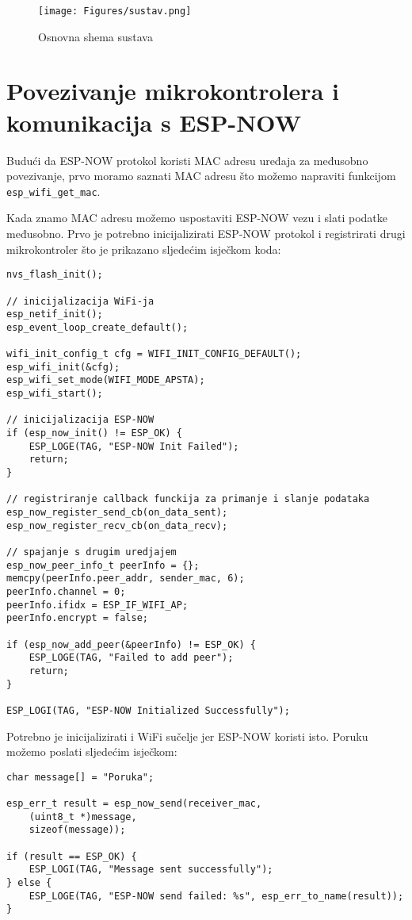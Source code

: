 \documentclass[seminarskirad]{fer}
\begin{document}
\begin{figure}[h!]
  \centering
  \texttt{[image: Figures/sustav.png]} 
  \caption{Osnovna shema sustava}
  \label{slk:prvaslika}
\end{figure}

\section{Povezivanje mikrokontrolera i komunikacija s ESP-NOW}

Budući da ESP-NOW protokol koristi MAC adresu uređaja za međusobno povezivanje, prvo moramo saznati MAC adresu što možemo napraviti funkcijom \verb|esp_wifi_get_mac|.

Kada znamo MAC adresu možemo uspostaviti ESP-NOW vezu i slati podatke međusobno. Prvo je potrebno inicijalizirati ESP-NOW protokol i registrirati drugi mikrokontroler što je prikazano sljedećim isječkom koda:

\begin{lstlisting}[caption=Inicijalizacija protokola]
nvs_flash_init();

// inicijalizacija WiFi-ja
esp_netif_init();
esp_event_loop_create_default();

wifi_init_config_t cfg = WIFI_INIT_CONFIG_DEFAULT();
esp_wifi_init(&cfg);
esp_wifi_set_mode(WIFI_MODE_APSTA);
esp_wifi_start();

// inicijalizacija ESP-NOW
if (esp_now_init() != ESP_OK) {
    ESP_LOGE(TAG, "ESP-NOW Init Failed");
    return;
}

// registriranje callback funckija za primanje i slanje podataka
esp_now_register_send_cb(on_data_sent);
esp_now_register_recv_cb(on_data_recv);

// spajanje s drugim uredjajem
esp_now_peer_info_t peerInfo = {};
memcpy(peerInfo.peer_addr, sender_mac, 6);
peerInfo.channel = 0;
peerInfo.ifidx = ESP_IF_WIFI_AP; 
peerInfo.encrypt = false;

if (esp_now_add_peer(&peerInfo) != ESP_OK) {
    ESP_LOGE(TAG, "Failed to add peer");
    return;
}

ESP_LOGI(TAG, "ESP-NOW Initialized Successfully");
\end{lstlisting}

Potrebno je inicijalizirati i WiFi sučelje jer ESP-NOW koristi isto. Poruku možemo poslati sljedećim isječkom:

\begin{lstlisting}[caption=Komunikacija ESP-NOW protokolom]
char message[] = "Poruka";
    
esp_err_t result = esp_now_send(receiver_mac, 
    (uint8_t *)message, 
    sizeof(message));

if (result == ESP_OK) {
    ESP_LOGI(TAG, "Message sent successfully");
} else {
    ESP_LOGE(TAG, "ESP-NOW send failed: %s", esp_err_to_name(result));
}
\end{lstlisting}
\end{document}
